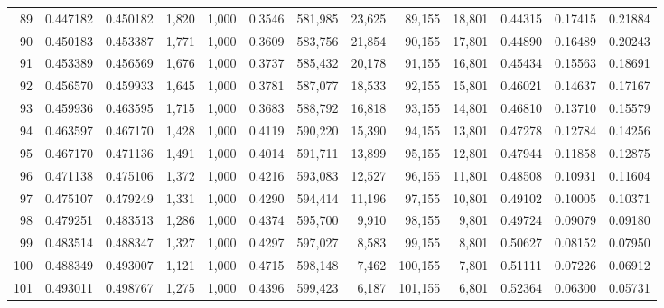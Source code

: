 \begin{tabular}{rrrrrrrrrrrrr}
89  &  0.447182 &  0.450182 &   1,820 &  1,000 &                                     0.3546 &  581,985 &   23,625 &   89,155 &   18,801 &  0.44315 &  0.17415 &  0.21884 \\
90  &  0.450183 &  0.453387 &   1,771 &  1,000 &                                     0.3609 &  583,756 &   21,854 &   90,155 &   17,801 &  0.44890 &  0.16489 &  0.20243 \\
91  &  0.453389 &  0.456569 &   1,676 &  1,000 &                                     0.3737 &  585,432 &   20,178 &   91,155 &   16,801 &  0.45434 &  0.15563 &  0.18691 \\
92  &  0.456570 &  0.459933 &   1,645 &  1,000 &                                     0.3781 &  587,077 &   18,533 &   92,155 &   15,801 &  0.46021 &  0.14637 &  0.17167 \\
93  &  0.459936 &  0.463595 &   1,715 &  1,000 &                                     0.3683 &  588,792 &   16,818 &   93,155 &   14,801 &  0.46810 &  0.13710 &  0.15579 \\
94  &  0.463597 &  0.467170 &   1,428 &  1,000 &                                     0.4119 &  590,220 &   15,390 &   94,155 &   13,801 &  0.47278 &  0.12784 &  0.14256 \\
95  &  0.467170 &  0.471136 &   1,491 &  1,000 &                                     0.4014 &  591,711 &   13,899 &   95,155 &   12,801 &  0.47944 &  0.11858 &  0.12875 \\
96  &  0.471138 &  0.475106 &   1,372 &  1,000 &                                     0.4216 &  593,083 &   12,527 &   96,155 &   11,801 &  0.48508 &  0.10931 &  0.11604 \\
97  &  0.475107 &  0.479249 &   1,331 &  1,000 &                                     0.4290 &  594,414 &   11,196 &   97,155 &   10,801 &  0.49102 &  0.10005 &  0.10371 \\
98  &  0.479251 &  0.483513 &   1,286 &  1,000 &                                     0.4374 &  595,700 &    9,910 &   98,155 &    9,801 &  0.49724 &  0.09079 &  0.09180 \\
99  &  0.483514 &  0.488347 &   1,327 &  1,000 &                                     0.4297 &  597,027 &    8,583 &   99,155 &    8,801 &  0.50627 &  0.08152 &  0.07950 \\
100 &  0.488349 &  0.493007 &   1,121 &  1,000 &                                     0.4715 &  598,148 &    7,462 &  100,155 &    7,801 &  0.51111 &  0.07226 &  0.06912 \\
101 &  0.493011 &  0.498767 &   1,275 &  1,000 &                                     0.4396 &  599,423 &    6,187 &  101,155 &    6,801 &  0.52364 &  0.06300 &  0.05731 \\

\end{tabular}
